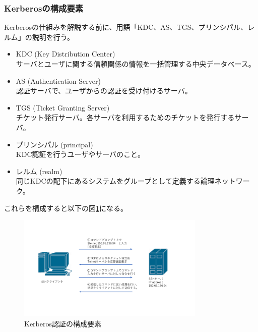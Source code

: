 \documentclass[12pt,a4paper,titlepage]{jreport}
\begin{document}
\subsubsection*{Kerberosの構成要素}
Kerberosの仕組みを解説する前に、用語「KDC、AS、TGS、プリンシパル、レルム」の説明を行う。
\begin{itemize}
    \item KDC (Key Distribution Center)\mbox{}\\サーバとユーザに関する信頼関係の情報を一括管理する中央データベース。
    \item AS (Authentication Server) \mbox{}\\認証サーバで、ユーザからの認証を受け付けるサーバ。
    \item TGS (Ticket Granting Server) \mbox{}\\チケット発行サーバ。各サーバを利用するためのチケットを発行するサーバ。
    \item プリンシパル (principal) \mbox{}\\ KDC認証を行うユーザやサーバのこと。
    \item レルム (realm)\mbox{}\\同じKDCの配下にあるシステムをグループとして定義する論理ネットワーク。
\end{itemize}
これらを構成すると以下の図\ref{KerberosCompornent}になる。
\begin{figure}[h]
    \begin{center}
        \includegraphics[width=0.8\textwidth, page=11]{graphs/network_archtecture.pdf}
        \caption{Kerberos認証の構成要素}
        \label{KerberosCompornent}
    \end{center}
\end{figure}\\
\end{document}
